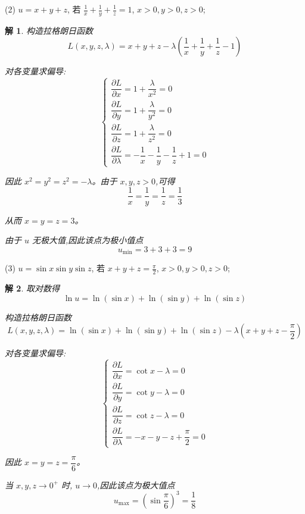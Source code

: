 \documentclass[a4paper,12pt]{article}
\newtheorem*{sol}{解}
\begin{document}
(2) $u = x + y + z$, 若 $\frac{1}{x} + \frac{1}{y} + \frac{1}{z} = 1$, $x > 0,y > 0,z > 0$;
\begin{sol}
    构造拉格朗日函数
    $$L(x,y,z,\lambda)=x+y+z-\lambda\left(\frac{1}{x}+\frac{1}{y}+\frac{1}{z}-1\right)$$

    对各变量求偏导:
    $$\begin{cases}
            \dfrac{\partial L}{\partial x}=1+\dfrac{\lambda}{x^2}=0 \\[8pt]
            \dfrac{\partial L}{\partial y}=1+\dfrac{\lambda}{y^2}=0 \\[8pt]
            \dfrac{\partial L}{\partial z}=1+\dfrac{\lambda}{z^2}=0 \\[8pt]
            \dfrac{\partial L}{\partial\lambda}=-\dfrac{1}{x}-\dfrac{1}{y}-\dfrac{1}{z}+1=0
        \end{cases}$$

    因此 $x^2=y^2=z^2=-\lambda$。由于 $x,y,z>0$,可得
    $$\dfrac{1}{x}=\dfrac{1}{y}=\dfrac{1}{z}=\dfrac{1}{3}$$

    从而 $x=y=z=3$。

    由于 $u$ 无极大值,因此该点为极小值点
    $$u_{\min}=3+3+3=9$$
\end{sol}

(3) $u = \sin x \sin y \sin z$, 若 $x + y + z = \frac{\pi}{2}$, $x > 0,y > 0,z > 0$;
\begin{sol}
    取对数得
    $$\ln u=\ln(\sin x)+\ln(\sin y)+\ln(\sin z)$$

    构造拉格朗日函数
    $$L(x,y,z,\lambda)=\ln(\sin x)+\ln(\sin y)+\ln(\sin z)-\lambda\left(x+y+z-\frac{\pi}{2}\right)$$

    对各变量求偏导:
    $$\begin{cases}
            \dfrac{\partial L}{\partial x}=\cot x-\lambda=0 \\[8pt]
            \dfrac{\partial L}{\partial y}=\cot y-\lambda=0 \\[8pt]
            \dfrac{\partial L}{\partial z}=\cot z-\lambda=0 \\[8pt]
            \dfrac{\partial L}{\partial \lambda}=-x-y-z+\dfrac{\pi}{2}=0
        \end{cases}$$

    因此 $x=y=z=\dfrac{\pi}{6}$。

    当 $x,y,z\to0^+$ 时, $u\to0$,因此该点为极大值点
    $$u_{\max}=\left(\sin\dfrac{\pi}{6}\right)^3=\dfrac{1}{8}$$
\end{sol}
\end{document}
